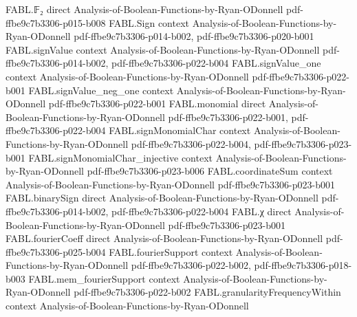 \begin{theorem}
\label{FABL.subsetDensity_binaryAffineSubspace_fourier_expansion}
\leanok
{}
\proofstep
  {FABL.𝔽₂}
  {direct}
  {Analysis-of-Boolean-Functions-by-Ryan-ODonnell}
  {pdf-ffbe9c7b3306-p015-b008}
\proofstep
  {FABL.Sign}
  {context}
  {Analysis-of-Boolean-Functions-by-Ryan-ODonnell}
  {pdf-ffbe9c7b3306-p014-b002,
    pdf-ffbe9c7b3306-p020-b001}
\proofstep
  {FABL.signValue}
  {context}
  {Analysis-of-Boolean-Functions-by-Ryan-ODonnell}
  {pdf-ffbe9c7b3306-p014-b002,
    pdf-ffbe9c7b3306-p022-b004}
\proofstep
  {FABL.signValue_one}
  {context}
  {Analysis-of-Boolean-Functions-by-Ryan-ODonnell}
  {pdf-ffbe9c7b3306-p022-b001}
\proofstep
  {FABL.signValue_neg_one}
  {context}
  {Analysis-of-Boolean-Functions-by-Ryan-ODonnell}
  {pdf-ffbe9c7b3306-p022-b001}
\proofstep
  {FABL.monomial}
  {direct}
  {Analysis-of-Boolean-Functions-by-Ryan-ODonnell}
  {pdf-ffbe9c7b3306-p022-b001,
    pdf-ffbe9c7b3306-p022-b004}
\proofstep
  {FABL.signMonomialChar}
  {context}
  {Analysis-of-Boolean-Functions-by-Ryan-ODonnell}
  {pdf-ffbe9c7b3306-p022-b004,
    pdf-ffbe9c7b3306-p023-b001}
\proofstep
  {FABL.signMonomialChar_injective}
  {context}
  {Analysis-of-Boolean-Functions-by-Ryan-ODonnell}
  {pdf-ffbe9c7b3306-p023-b006}
\proofstep
  {FABL.coordinateSum}
  {context}
  {Analysis-of-Boolean-Functions-by-Ryan-ODonnell}
  {pdf-ffbe9c7b3306-p023-b001}
\proofstep
  {FABL.binarySign}
  {direct}
  {Analysis-of-Boolean-Functions-by-Ryan-ODonnell}
  {pdf-ffbe9c7b3306-p014-b002,
    pdf-ffbe9c7b3306-p022-b004}
\proofstep
  {FABL.χ}
  {direct}
  {Analysis-of-Boolean-Functions-by-Ryan-ODonnell}
  {pdf-ffbe9c7b3306-p023-b001}
\proofstep
  {FABL.fourierCoeff}
  {direct}
  {Analysis-of-Boolean-Functions-by-Ryan-ODonnell}
  {pdf-ffbe9c7b3306-p025-b004}
\proofstep
  {FABL.fourierSupport}
  {context}
  {Analysis-of-Boolean-Functions-by-Ryan-ODonnell}
  {pdf-ffbe9c7b3306-p022-b002,
    pdf-ffbe9c7b3306-p018-b003}
\proofstep
  {FABL.mem_fourierSupport}
  {context}
  {Analysis-of-Boolean-Functions-by-Ryan-ODonnell}
  {pdf-ffbe9c7b3306-p022-b002}
\proofstep
  {FABL.granularityFrequencyWithin}
  {context}
  {Analysis-of-Boolean-Functions-by-Ryan-ODonnell}

\end{theorem}
